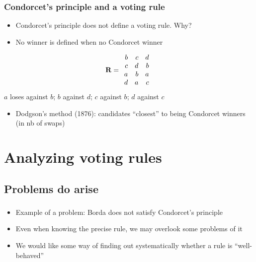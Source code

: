 \documentclass[french,english]{beamer}
\begin{document}
\begin{frame}
	\frametitle{Condorcet’s principle and a voting rule}
	\begin{itemize}
		\item Condorcet’s principle does not define a voting rule. Why? \pause
		\item No winner is defined when no Condorcet winner
	\end{itemize}
	\begin{equation}
		\mathbf{R} =
		\begin{array}{rrr}
			b	&	c	&	d\\
			c	&	d	&	b\\
			a	&	b	&	a\\
			d	&	a	&	c
		\end{array}
	\end{equation}
	\pause
	$a$ loses against $b$; $b$ against $d$; $c$ against $b$; $d$ against $c$
	\begin{itemize}
		\item Dodgson’s method (1876): candidates “closest” to being Condorcet winners {\tiny (in nb of swaps)}
	\end{itemize}
\end{frame}

\section{Analyzing voting rules}
\subsection[Problem]{Problems do arise}
\begin{frame}
	\frametitle{\subsecname}
	\begin{itemize}
		\item Example of a problem: Borda does not satisfy Condorcet’s principle
		\item Even when knowing the precise rule, we may overlook some problems of it
		\item We would like some way of finding out systematically whether a rule is “well-behaved”
	\end{itemize}
\end{frame}
\end{document}
